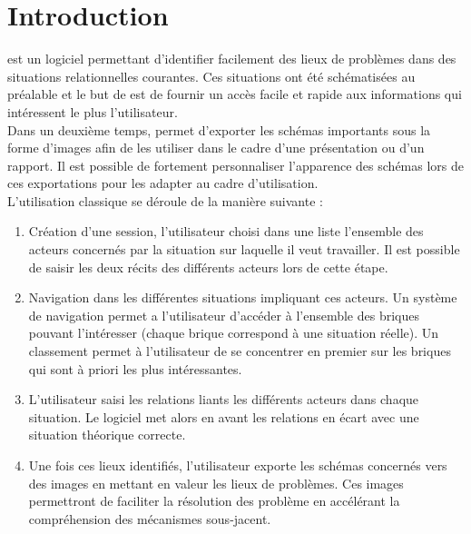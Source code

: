 


\tableofcontents
\chapter*{Introduction}

\tria est un logiciel permettant d'identifier facilement des lieux de problèmes dans des situations relationnelles courantes. Ces situations ont été schématisées au préalable et le but de \tria est de fournir un accès facile et rapide aux informations qui intéressent le plus l'utilisateur.\\

Dans un deuxième temps, \tria permet d'exporter les schémas importants sous la forme d'images afin de les utiliser dans le cadre d'une présentation ou d'un rapport. Il est possible de fortement personnaliser l'apparence des schémas lors de ces exportations pour les adapter au cadre d'utilisation.\\

L'utilisation classique se déroule de la manière suivante :\\
\begin{enumerate}
\item Création d'une session, l'utilisateur choisi dans une liste l'ensemble des acteurs concernés par la situation sur laquelle il veut travailler. Il est possible de saisir les deux récits des différents acteurs lors de cette étape.\\
\item Navigation dans les différentes situations impliquant ces acteurs. Un système de navigation permet a l'utilisateur d'accéder à l'ensemble des briques pouvant l'intéresser (chaque brique correspond à une situation réelle). Un classement permet à l'utilisateur de se concentrer en premier sur les briques qui sont à priori les plus intéressantes.\\
\item L'utilisateur saisi les relations liants les différents acteurs dans chaque situation. Le logiciel met alors en avant les relations en écart avec une situation théorique correcte.\\
\item Une fois ces lieux identifiés, l'utilisateur exporte les schémas concernés vers des images en mettant en valeur les lieux de problèmes. Ces images permettront de faciliter la résolution des problème en accélérant la compréhension des mécanismes sous-jacent.\\
\end{enumerate}



